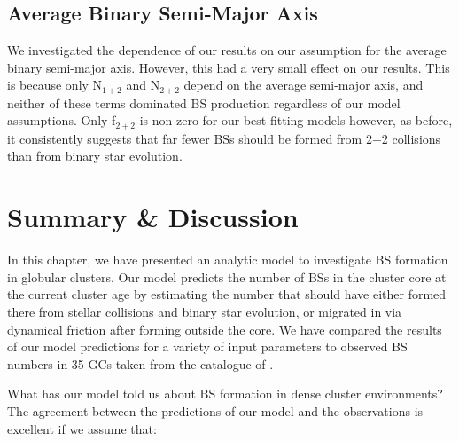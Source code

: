 \subsection{Average Binary Semi-Major Axis} \label{avg-a}

We investigated the dependence of our results on our assumption for
the average binary semi-major axis.  However, this had a very small
effect on our results.  This is because only N$_{1+2}$ and N$_{2+2}$
depend on the average semi-major axis, and neither of these terms
dominated BS production regardless of our model
assumptions.  Only f$_{2+2}$ is
non-zero for our best-fitting models however, as before, it consistently
suggests that far fewer BSs should be formed from 2+2 collisions than from
binary star evolution. 

\section{Summary \& Discussion} \label{discussion5}

In this chapter, we have presented an analytic model to investigate BS
formation in globular clusters.  Our model predicts the number of BSs
in the cluster core at the current cluster age by estimating the
number that should have either formed 
there from stellar collisions and binary star evolution, or migrated
in via dynamical friction after forming outside the core.  We have
compared the results of our model predictions for a variety of input
parameters to observed BS numbers in 35 GCs taken from the catalogue of
\citet{leigh11a}.   

What has our model told us about BS formation in dense cluster
environments?  
The agreement between the predictions of our model and the
observations is excellent if we assume that:

